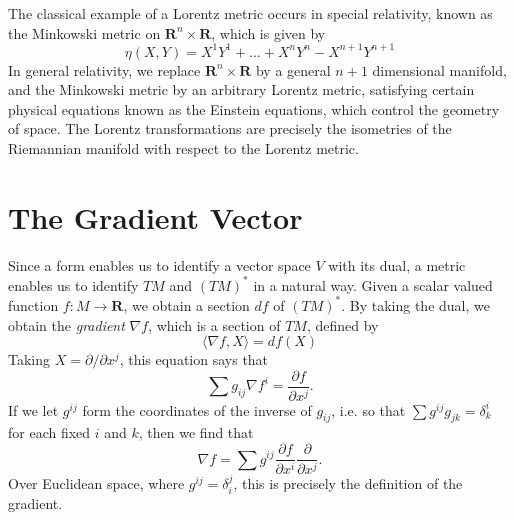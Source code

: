 \begin{example}
    The classical example of a Lorentz metric occurs in special relativity, known as the Minkowski metric on $\mathbf{R}^n \times \mathbf{R}$, which is given by
    \[ \eta(X,Y) = X^1Y^1 + \dots + X^nY^n - X^{n+1}Y^{n+1} \]
    In general relativity, we replace $\mathbf{R}^n \times \mathbf{R}$ by a general $n+1$ dimensional manifold, and the Minkowski metric by an arbitrary Lorentz metric, satisfying certain physical equations known as the Einstein equations, which control the geometry of space. The Lorentz transformations are precisely the isometries of the Riemannian manifold with respect to the Lorentz metric.
\end{example}

\section{The Gradient Vector}

Since a form enables us to identify a vector space $V$ with its dual, a metric enables us to identify $TM$ and $(TM)^*$ in a natural way. Given a scalar valued function $f: M \to \mathbf{R}$, we obtain a section $df$ of $(TM)^*$. By taking the dual, we obtain the \emph{gradient} $\nabla f$, which is a section of $TM$, defined by
%
\[ \langle \nabla f, X \rangle = df(X) \]
%
Taking $X = \partial / \partial x^j$, this equation says that
%
\[ \sum g_{ij} \nabla f^i = \frac{\partial f}{\partial x^j}. \]
%
If we let $g^{ij}$ form the coordinates of the inverse of $g_{ij}$, i.e. so that $\sum g^{ij} g_{jk} = \delta^i_k$ for each fixed $i$ and $k$, then we find that
%
\[ \nabla f = \sum g^{ij} \frac{\partial f}{\partial x^i} \frac{\partial}{\partial x^j}. \]
%
Over Euclidean space, where $g^{ij} = \delta_i^j$, this is precisely the definition of the gradient.

